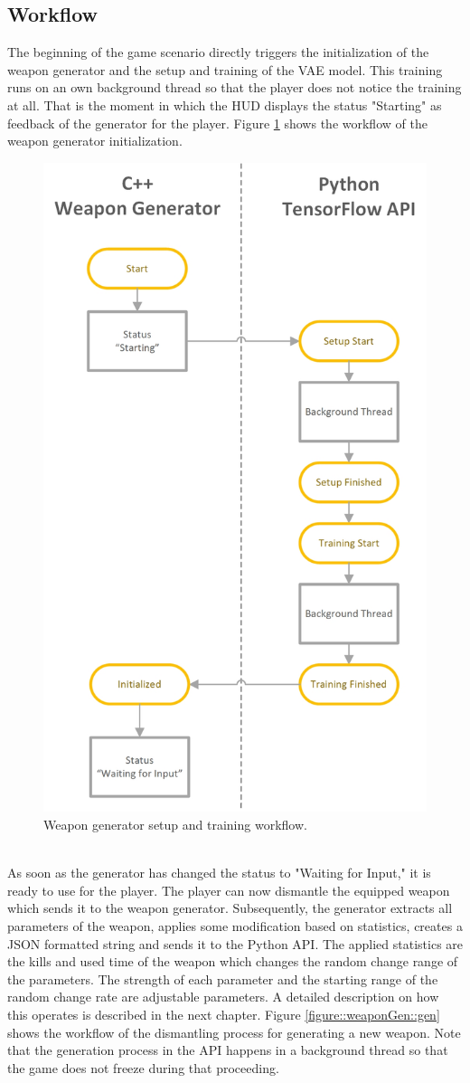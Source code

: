\documentclass[MGS,Master,english]{twbook}%
\begin{document}
\subsection{Workflow}
The beginning of the game scenario directly triggers the initialization of the weapon generator and the setup and training of the VAE model. This training runs on an own background thread so that the player does not notice the training at all. That is the moment in which the HUD displays the status "Starting" as feedback of the generator for the player. Figure \ref{figure::weaponGen::init} shows the workflow of the weapon generator initialization.
\begin{figure}[!ht]
	\centering
	\includegraphics[width=0.5\linewidth]{PICs/WeaponGeneratorWorkflow_Setup_Training}
	\caption{Weapon generator setup and training workflow.} \label{figure::weaponGen::init}
\end{figure}\\
As soon as the generator has changed the status to "Waiting for Input," it is ready to use for the player. The player can now dismantle the equipped weapon which sends it to the weapon generator. Subsequently, the generator extracts all parameters of the weapon, applies some modification based on statistics, creates a JSON formatted string and sends it to the Python API. The applied statistics are the kills and used time of the weapon which changes the random change range of the parameters. The strength of each parameter and the starting range of the random change rate are adjustable parameters. A detailed description on how this operates is described in the next chapter. Figure \ref{figure::weaponGen::gen} shows the workflow of the dismantling process for generating a new weapon. Note that the generation process in the API happens in a background thread so that the game does not freeze during that proceeding.
\end{document}

